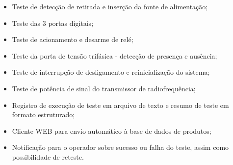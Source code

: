 \begin{itemize}
            \item Teste de detecção de retirada e inserção da fonte de alimentação;
            \item Teste das 3 portas digitais;
            \item Teste de acionamento e desarme de relé;
            \item Teste da porta de tensão trifásica - detecção de presença e ausência;
            \item Teste de interrupção de desligamento e reinicialização do sistema;
            \item Teste de potência de sinal do transmissor de radiofrequência;
            \item Registro de execução de teste em arquivo de texto e resumo de teste em formato estruturado;
            \item Cliente WEB para envio automático à base de dados de produtos;
            \item Notificação para o operador sobre sucesso ou falha do teste, assim como possibilidade de reteste.
        \end{itemize}
    
    


\begin{comment}
    \subsection{Workflow do projeto} %
       
     
    
    Validação do projeto
    Controle de Qualidade
    Melhorias de processos
    Melhorias no produto
    Auxilio na Manutenção
\end{comment}    